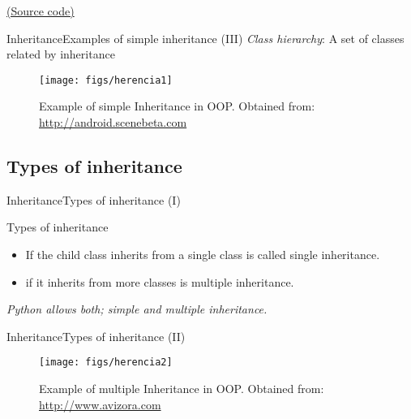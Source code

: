 \documentclass[10pt,compress]{beamer} %
\begin{document}
\begin{frame}[plain]%
	\begin{exampleblock}{}
	\vspace{-0.3cm} 
		
	\end{exampleblock}

	\href{https://gist.github.com/dfbarrero/9b30c749986885373c8c250b3901ec9d}{(Source code)}
\end{frame}

\begin{frame}{Inheritance}{Examples of simple inheritance (III)}
	\textit{Class hierarchy}: A set of classes related by inheritance  \\
	\begin{figure}
		\texttt{[image: figs/herencia1]}
		\caption{{\scriptsize Example of simple Inheritance in OOP. Obtained from: \url{http://android.scenebeta.com}}}
	\end{figure}
\end{frame}

\subsection{Types of inheritance}

\begin{frame}{Inheritance}{Types of inheritance (I)}
	\begin{block}{Types of inheritance}
	\begin{itemize}
		\item If the child class inherits from a single class is called \alert{single inheritance}.
		\item if it inherits from more classes is \alert{multiple inheritance}.
	\end{itemize}
	\end{block}
	\medskip
	   \textit{Python allows both; simple and multiple inheritance.}
\end{frame}

\begin{frame}{Inheritance}{Types of inheritance (II)}
	\begin{figure}
		\texttt{[image: figs/herencia2]}
		\caption{{\scriptsize Example of multiple Inheritance in OOP. Obtained from: \url{http://www.avizora.com}}}
	\end{figure}
\end{frame}
\end{document}

